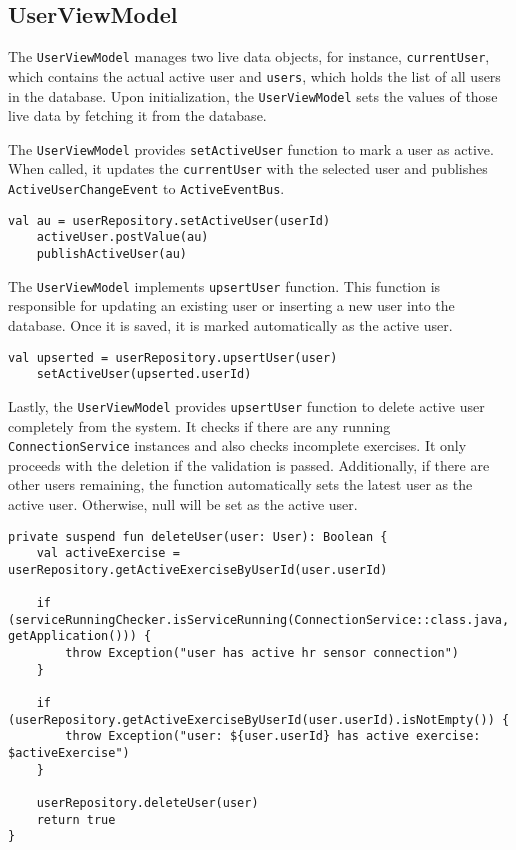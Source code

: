 \subsection{UserViewModel}
\label{chap:userviewmodel_impl}
The \texttt{UserViewModel} manages two live data objects, for instance, \texttt{currentUser}, which contains the actual active user and \texttt{users}, which holds the list of all users in the database. 
Upon initialization, the \texttt{UserViewModel} sets the values of those live data by fetching it from the database.

The \texttt{UserViewModel} provides \texttt{setActiveUser} function to mark a user as active. When called, it updates the \texttt{currentUser} with the selected user and publishes \texttt{ActiveUserChangeEvent} to \texttt{ActiveEventBus}.
\begin{lstlisting}[caption={Set active user function snippet (UserViewModel)}]
    val au = userRepository.setActiveUser(userId)
    activeUser.postValue(au)
    publishActiveUser(au)
\end{lstlisting}

The \texttt{UserViewModel} implements \texttt{upsertUser} function. This function is responsible for updating an existing user or inserting a new user into the database. Once it is saved, it is marked automatically as the active user.
\begin{lstlisting}[caption={Save user function snippet (UserViewModel)}]
    val upserted = userRepository.upsertUser(user)
    setActiveUser(upserted.userId)
\end{lstlisting}

Lastly, the \texttt{UserViewModel} provides \texttt{upsertUser} function to delete active user completely from the system.
It checks if there are any running \texttt{ConnectionService} instances and also checks incomplete exercises. 
It only proceeds with the deletion if the validation is passed. Additionally, if there are other users remaining, the function automatically sets the latest user as the active user. Otherwise, null will be set as the active user.
\begin{lstlisting}[caption={Wrapper function for user deletion (UserViewModel)}]
private suspend fun deleteUser(user: User): Boolean {
    val activeExercise = userRepository.getActiveExerciseByUserId(user.userId)

    if (serviceRunningChecker.isServiceRunning(ConnectionService::class.java, getApplication())) {
        throw Exception("user has active hr sensor connection")
    }

    if (userRepository.getActiveExerciseByUserId(user.userId).isNotEmpty()) {
        throw Exception("user: ${user.userId} has active exercise: $activeExercise")
    }

    userRepository.deleteUser(user)
    return true
}
\end{lstlisting}

